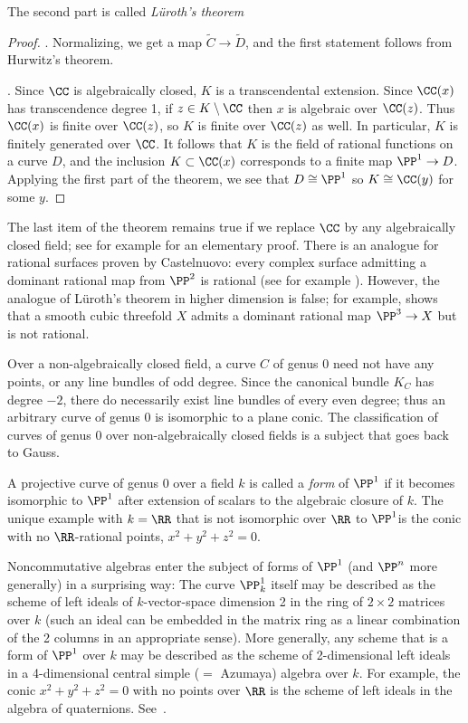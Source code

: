 The second part is called \emph{L\"uroth's theorem}
 
\begin{proof}
. Normalizing, we get a map  $ \tilde C \to \tilde D$, and the first statement follows from Hurwitz's theorem.

\medbreak

. Since $\CC$ is algebraically closed, $K$ is a transcendental extension. Since $\CC(x)$ has
transcendence degree 1, if $z\in K\setminus \CC$
then $x$ is algebraic over $\CC(z)$. Thus $\CC(x)$ is finite over $\CC(z)$, so $K$ is finite over $\CC(z)$
as well. In particular, $K$ is finitely generated over $\CC$. It follows that $K$ is the field of rational functions
on a curve $D$, and the inclusion $K\subset \CC(x)$ corresponds to a finite map $\PP^1\to D$. Applying
the first part of the theorem, we see that $D\cong \PP^1$ so $K \cong \CC(y)$ for some $y$.
\end{proof}
 
\begin{fact}
The last item of the theorem remains true if we replace $\CC$ by any algebraically closed field; see for example \cite[Section 8.13]{JacobsonII} for an elementary proof.
There is an analogue for rational surfaces proven by Castelnuovo: every complex surface admitting a dominant rational
map from $\PP^2$ is rational (see for example \cite[Corollary V.5]{Beauville}). However, the analogue of L\"uroth's theorem in higher dimension is false; for example, \cite{MR0302652} shows that a smooth cubic threefold $X$ admits a dominant rational map $\PP^3 \to X$ but is not rational.

Over a non-algebraically closed field, a curve $C$ of genus 0 need not have any points, or any line bundles of odd degree. Since the canonical bundle $K_C$ has degree $-2$, there do necessarily exist line bundles of every even degree; thus an arbitrary curve of genus 0 is isomorphic to a  plane conic. 
The classification of curves of genus 0 over non-algebraically closed fields is a subject that goes back to Gauss.

A projective curve of genus 0 over a field $k$ is called a \emph{form} of $\PP^1$ if it becomes isomorphic to $\PP^1$ after extension
of scalars to
the algebraic closure of $k$. The unique example with $k = \RR$ that is not isomorphic over $\RR$ to $\PP^1$is the conic with no $\RR$-rational points, $x^2+y^2+z^2 = 0$. 

Noncommutative algebras enter the subject of forms of $\PP^1$ (and $\PP^n$ more generally) in a surprising way: The curve $\PP_k^1$ itself may be described as the scheme of left ideals of $k$-vector-space dimension 2 in the ring of
$2\times 2$ matrices over $k$ (such an ideal can be embedded in the matrix ring as a linear combination of the 2 columns in an appropriate sense). More generally, any scheme that is a form of $\PP^1$ over $k$
may be described as the scheme of 2-dimensional left ideals in a 4-dimensional central simple ($=$ Azumaya) algebra over $k$. For example, the
conic $x^2+y^2+z^2 = 0$ with no points over $\RR$ is the scheme of left ideals in the algebra of quaternions. See~\cite[Section X.6]{Serre1979}.
\end{fact}

